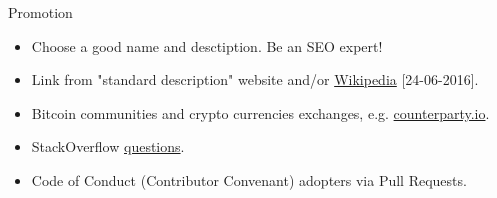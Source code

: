 \documentclass[unicode, notheorems, aspectratio=169]{beamer}
\begin{document}
\begin{frame}{Promotion}
\begin{itemize}
\item Choose a good name and desctiption. Be an SEO expert!
\item Link from "standard description" website and/or \href{https://web.archive.org/web/20160624152815/https://en.wikipedia.org/wiki/JSON-RPC}{Wikipedia} [24-06-2016].
\item Bitcoin communities and crypto currencies exchanges, e.g. \href{https://counterparty.io/}{counterparty.io}.
\item StackOverflow \href{https://stackoverflow.com/questions/5467919/json-rpc-python-client/19887957\#19887957}{questions}.
\item Code of Conduct (Contributor Convenant) adopters via Pull Requests.
\end{itemize}
\end{frame}
\end{document}

